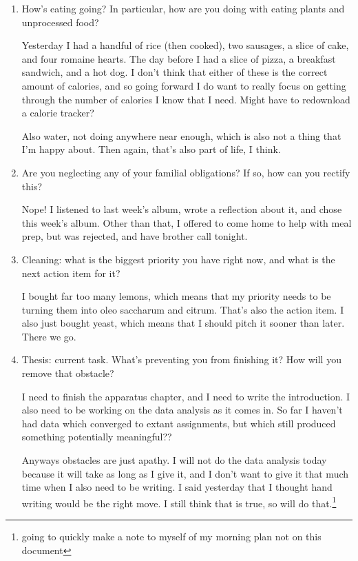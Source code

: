 \documentclass[12pt]{article}
\renewcommand{\,}{\textsuperscript{,}}
\begin{document}
\begin{enumerate}
\item How's eating going? In particular, how are you doing with eating plants and unprocessed food?

Yesterday I had a handful of rice (then cooked), two sausages, a slice of cake, and four romaine hearts.  
The day before I had a slice of pizza, a breakfast sandwich, and a hot dog.  
I don't think that either of these is the correct amount of calories, and so going forward I do want to really focus on getting through the number of calories I know that I need.  
Might have to redownload a calorie tracker?

Also water, not doing anywhere near enough, which is also not a thing that I'm happy about.  
Then again, that's also part of life, I think.

\item Are you neglecting any of your familial obligations? If so, how can you rectify this?

Nope! I listened to last week's album, wrote a reflection about it, and chose this week's album.  
Other than that, I offered to come home to help with meal prep, but was rejected, and have brother call tonight.\

\item Cleaning: what is the biggest priority you have right now, and what is the next action item for it?

I bought far too many lemons, which means that my priority needs to be turning them into oleo saccharum and citrum.  
That's also the action item.  
I also just bought yeast, which means that I should pitch it sooner than later.  
There we go.

\item Thesis: current task. What's preventing you from finishing it? How will you remove that obstacle?

I need to finish the apparatus chapter, and I need to write the introduction.  
I also need to be working on the data analysis as it comes in.  
So far I haven't had data which converged to extant assignments, but which still produced something potentially meaningful??

Anyways obstacles are just apathy.  
I will not do the data analysis today because it will take as long as I give it, and I don't want to give it that much time when I also need to be writing.  
I said yesterday that I thought hand writing would be the right move.  
I still think that is true, so will do that.\footnote{going to quickly make a note to myself of my morning plan not on this document}


\end{enumerate}
\end{document}

